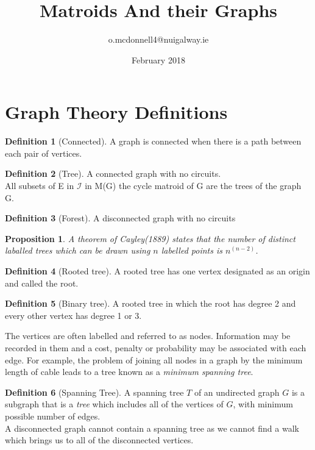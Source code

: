\documentclass{article}
\title{Matroids And their Graphs}
\author{o.mcdonnell4@nuigalway.ie }
\date{February 2018}
\theoremstyle{plain}
\newtheorem{prop}[thm]{Proposition}
\theoremstyle{definition}
\newtheorem{defn}{Definition}[section]
\theoremstyle{remark}
\begin{document}
\maketitle
 
 \section{Graph Theory Definitions}
 
\begin{defn}[Connected]
A graph is connected when there is a path between each pair of vertices.
\end{defn}
 
 
 \begin{defn}[Tree]
 A connected graph with no circuits.\\
 \noindent All subsets of E in $\mathcal{I}$ in M(G) the cycle matroid of G are the trees of the graph G.
 \end{defn}
 \begin{defn}[Forest]
 A disconnected graph with no circuits
 \end{defn}
 \begin{prop}
 A theorem of Cayley(1889) states that the number of distinct laballed trees which can be drawn using $n$ labelled points is $ n^(n-2)$.
 \end{prop}
 \begin{defn}[Rooted tree]
 A rooted tree has one vertex designated as an origin and called the root.
 \end{defn}
 \begin{defn}[Binary tree]
 A rooted tree in which the root has degree 2 and every other vertex has degree 1 or 3.
 \end{defn}
 
 \vspace{5mm}
 
\noindent The vertices are often labelled and referred to as nodes. Information may be recorded in them and a cost, penalty or probability may be associated with each edge. For example, the problem of joining all nodes in a graph by the minimum length of cable leads to a tree known as a \textit{minimum spanning tree}.
 
 \vspace{5mm}
 
\begin{defn}[Spanning Tree]
A spanning tree $T$ of an undirected graph $G$ is a subgraph that is a \textit{tree} which includes all of the vertices of $G$, with minimum possible number of edges.\\
\noindent A disconnected graph cannot contain a spanning tree as we cannot find a walk which brings us to all of the disconnected vertices.
\end{defn}
 
\end{document}
